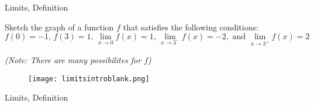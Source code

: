 \begin{tagblock}{Limits, Definition}
\begin{question}
	Sketch the graph of a function $f$ that satisfies the following conditions: \\
\[  f(0)=-1,   \, f(3) =1 , \, \lim_{x \to 0} f(x) =1, \, \lim_{x \to 3^-} f(x) = -2, \text{ and } \lim_{x \to 3^+} f(x) = 2 \]

\emph{(Note: There are many possibilites for $f$)}

\begin{figure}[h]
\centering
\texttt{[image: limitsintroblank.png]}
\end{figure}
	
	
\begin{tags}
	    Limits, Definition
\end{tags}
	
\begin{diary}
	    
\end{diary}
	
\begin{solution}
	  
\end{solution}
	
\end{question}

\end{tagblock}


